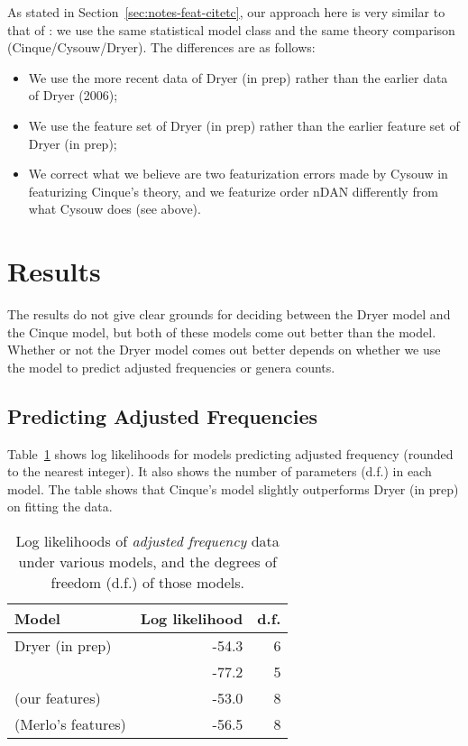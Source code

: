 \documentclass[11pt]{article}
\begin{document}
As stated in Section~\ref{sec:notes-feat-citetc}, our approach here is
very similar to that of \citet{cysouw2010dealing}: we use the same
statistical model class and the same theory comparison
(Cinque/Cysouw/Dryer).  The differences are as follows:
%
\begin{itemize}
\item We use the more recent data of Dryer (in prep) rather than the
  earlier data of Dryer (2006);
\item We use the feature set of Dryer (in prep) rather than the
  earlier feature set of Dryer (in prep);
\item We correct what we believe are two featurization errors made by
  Cysouw in featurizing Cinque's theory, and we featurize order nDAN
  differently from what Cysouw does (see above).
\end{itemize}


\section{Results}

The results do not give clear grounds for deciding between the Dryer model and the Cinque model, but both of these models come out better than the \citet{cysouw2010dealing} model. Whether or not the Dryer model comes out better depends on whether we use the model to predict adjusted frequencies or genera counts.

\subsection{Predicting Adjusted Frequencies}

Table~\ref{tab:af-likelihoods} shows log likelihoods for models predicting adjusted frequency (rounded to the nearest integer). It also shows the number of parameters (d.f.) in each model. The table shows that Cinque's model slightly outperforms Dryer (in prep) on fitting the data.

\begin{table}
  \centering
  \begin{tabular}{|l|r|r|}
    \hline
    Model & Log likelihood & d.f. \\
    \hline
    Dryer (in prep) & -54.3 & 6 \\
    \citet{cysouw2010dealing} & -77.2 & 5 \\
    \citet{cinque2005deriving} (our features) & -53.0 & 8 \\
    \citet{cinque2005deriving} (Merlo's features) & -56.5 & 8\\
    \hline
  \end{tabular}
  \caption{Log likelihoods of \emph{adjusted frequency} data under various models, and the degrees of freedom (d.f.) of those models.}
  \label{tab:af-likelihoods}
\end{table}
\end{document}
